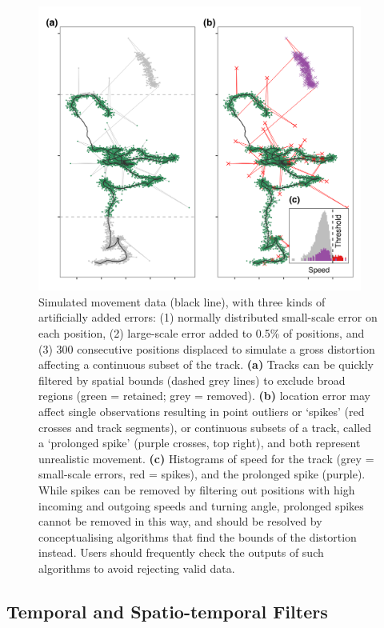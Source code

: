 \documentclass[10pt,paper=a4,headings=standardclasses
]{scrartcl}
\begin{document}
\begin{figure}[h!]
    \centering
    \includegraphics[width=0.95\textwidth]{figures/fig_02_filtering_data.png}
    \caption{Simulated movement data (black line), with three kinds of artificially added errors: (1) normally distributed small-scale error on each position, (2) large-scale error added to 0.5\% of positions, and (3) 300 consecutive positions displaced to simulate a gross distortion affecting a continuous subset of the track.  
    \textbf{(a)} Tracks can be quickly filtered by spatial bounds (dashed grey lines) to exclude broad regions (green = retained; grey = removed).
    \textbf{(b)} location error may affect single observations resulting in point outliers or `spikes' (red crosses and track segments), or continuous subsets of a track, called a `prolonged spike' (purple crosses, top right), and both represent unrealistic movement.
    \textbf{(c)} Histograms of speed for the track (grey = small-scale errors, red = spikes), and the prolonged spike (purple).
    While spikes can be removed by filtering out positions with high incoming and outgoing speeds and turning angle, prolonged spikes cannot be removed in this way, and should be resolved by conceptualising algorithms that find the bounds of the distortion instead.
    Users should frequently check the outputs of such algorithms to avoid rejecting valid data.
    }
    \label{fig:figure_filtering_data}
\end{figure}

\subsection{Temporal and Spatio-temporal Filters}
\end{document}
